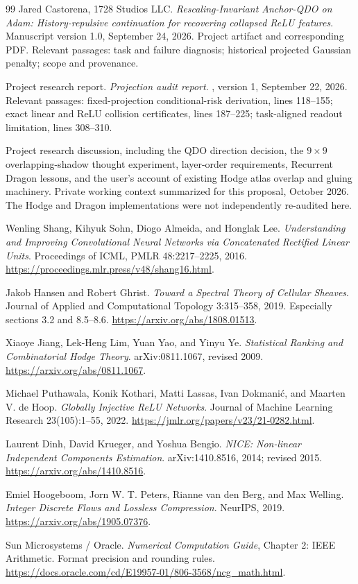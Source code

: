 \begin{thebibliography}{99}
Jared Castorena, 1728 Studios LLC.
\emph{Rescaling-Invariant Anchor-QDO on Adam:
History-repulsive continuation for recovering collapsed ReLU features}.
Manuscript version 1.0, September 24, 2026.
Project artifact  and corresponding PDF.
Relevant passages: task and failure diagnosis; historical projected Gaussian
penalty; scope and provenance.

Project research report.
\emph{Projection audit report}.
, version 1, September 22, 2026.
Relevant passages: fixed-projection conditional-risk derivation, lines
118--155; exact linear and ReLU collision certificates, lines 187--225;
task-aligned readout limitation, lines 308--310.

Project research discussion, including the QDO direction decision,
the \(9\times9\) overlapping-shadow thought experiment, layer-order
requirements, Recurrent Dragon lessons, and the user's account of existing
Hodge atlas overlap and gluing machinery.
Private working context summarized for this proposal, October 2026.
The Hodge and Dragon implementations were not independently re-audited here.

Wenling Shang, Kihyuk Sohn, Diogo Almeida, and Honglak Lee.
\emph{Understanding and Improving Convolutional Neural Networks via
Concatenated Rectified Linear Units}.
Proceedings of ICML, PMLR 48:2217--2225, 2016.
\url{https://proceedings.mlr.press/v48/shang16.html}.

Jakob Hansen and Robert Ghrist.
\emph{Toward a Spectral Theory of Cellular Sheaves}.
Journal of Applied and Computational Topology 3:315--358, 2019.
Especially sections 3.2 and 8.5--8.6.
\url{https://arxiv.org/abs/1808.01513}.

Xiaoye Jiang, Lek-Heng Lim, Yuan Yao, and Yinyu Ye.
\emph{Statistical Ranking and Combinatorial Hodge Theory}.
arXiv:0811.1067, revised 2009.
\url{https://arxiv.org/abs/0811.1067}.

Michael Puthawala, Konik Kothari, Matti Lassas, Ivan Dokmani\'c,
and Maarten V. de Hoop.
\emph{Globally Injective ReLU Networks}.
Journal of Machine Learning Research 23(105):1--55, 2022.
\url{https://jmlr.org/papers/v23/21-0282.html}.

Laurent Dinh, David Krueger, and Yoshua Bengio.
\emph{NICE: Non-linear Independent Components Estimation}.
arXiv:1410.8516, 2014; revised 2015.
\url{https://arxiv.org/abs/1410.8516}.

Emiel Hoogeboom, Jorn W. T. Peters, Rianne van den Berg, and Max Welling.
\emph{Integer Discrete Flows and Lossless Compression}.
NeurIPS, 2019.
\url{https://arxiv.org/abs/1905.07376}.

Sun Microsystems / Oracle.
\emph{Numerical Computation Guide}, Chapter 2: IEEE Arithmetic.
Format precision and rounding rules.
\url{https://docs.oracle.com/cd/E19957-01/806-3568/ncg_math.html}.
\end{thebibliography}
